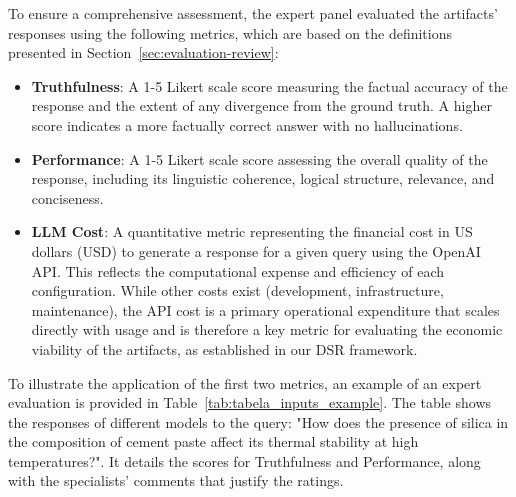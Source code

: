             To ensure a comprehensive assessment, the expert panel evaluated the artifacts' responses using the following metrics, which are based on the definitions presented in Section~\ref{sec:evaluation-review}:

            \begin{itemize}

                \item \textbf{Truthfulness}: A 1-5 Likert scale score measuring the factual accuracy of the response and the extent of any divergence from the ground truth. A higher score indicates a more factually correct answer with no hallucinations.

                \item \textbf{Performance}: A 1-5 Likert scale score assessing the overall quality of the response, including its linguistic coherence, logical structure, relevance, and conciseness.

                \item \textbf{LLM Cost}: A quantitative metric representing the financial cost in US dollars (USD) to generate a response for a given query using the OpenAI API. This reflects the computational expense and efficiency of each configuration. While other costs exist (development, infrastructure, maintenance), the API cost is a primary operational expenditure that scales directly with usage and is therefore a key metric for evaluating the economic viability of the artifacts, as established in our DSR framework.
            
            \end{itemize}

            To illustrate the application of the first two metrics, an example of an expert evaluation is provided in Table~\ref{tab:tabela_inputs_example}. The table shows the responses of different models to the query: "How does the presence of silica in the composition of cement paste affect its thermal stability at high temperatures?". It details the scores for Truthfulness and Performance, along with the specialists' comments that justify the ratings.



